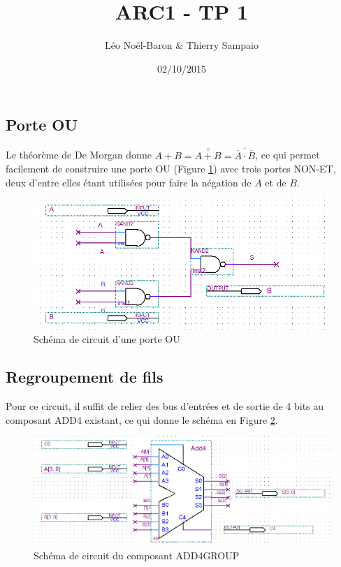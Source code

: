 \documentclass[a4paper,11pt]{article}
\title{ARC1 - TP 1}
\author{Léo Noël-Baron \& Thierry Sampaio}
\date{02/10/2015}
\begin{document}
\maketitle

\subsection*{Porte OU}

Le théorème de De Morgan donne $A+B = \overline{\overline{A+B}} = \overline{\overline{A}\cdot\overline{B}}$, ce qui permet facilement de construire une porte OU (Figure \ref{nandor}) avec trois portes NON-ET, deux d'entre elles étant utilisées pour faire la négation de $A$ et de $B$.

\begin{figure}
\center
\includegraphics[scale=0.6]{nandor.png}
\caption{Schéma de circuit d'une porte OU}
\label{nandor}
\end{figure}

\subsection*{Regroupement de fils}

Pour ce circuit, il suffit de relier des bus d'entrées et de sortie de 4 bits au composant ADD4 existant, ce qui donne le schéma en Figure \ref{add4group}.

\begin{figure}
\center
\includegraphics[scale=0.58]{add4.png}
\caption{Schéma de circuit du composant ADD4GROUP}
\label{add4group}
\end{figure}
\end{document}
